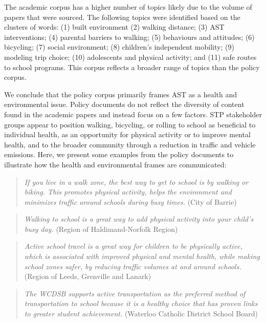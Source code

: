 \documentclass[]{elsarticle} %
\begin{document}
The academic corpus has a higher number of topics likely due to the
volume of papers that were sourced. The following topics were identified
based on the clusters of words: (1) built environment (2) walking
distance; (3) AST interventions; (4) parental barriers to walking; (5)
behaviours and attitudes; (6) bicycling; (7) social environment; (8)
children's independent mobility; (9) modeling trip choice; (10)
adolescents and physical activity; and (11) safe routes to school
programs. This corpus reflects a broader range of topics than the policy
corpus.

We conclude that the policy corpus primarily frames AST as a health and
environmental issue. Policy documents do not reflect the diversity of
content found in the academic papers and instead focus on a few factors.
STP stakeholder groups appear to position walking, bicycling, or rolling
to school as beneficial to individual health, as an opportunity for
physical activity or to improve mental health, and to the broader
community through a reduction in traffic and vehicle emissions. Here, we
present some examples from the policy documents to illustrate how the
health and environmental frames are communicated:

\begin{quote}
\emph{If you live in a walk zone, the best way to get to school is by
walking or biking. This promotes physical activity, helps the
environment and minimizes traffic around schools during busy times.}
(City of Barrie)
\end{quote}

\begin{quote}
\emph{Walking to school is a great way to add physical activity into
your child's busy day.} (Region of Haldimand-Norfolk Region)
\end{quote}

\begin{quote}
\emph{Active school travel is a great way for children to be physically
active, which is associated with improved physical and mental health,
while making school zones safer, by reducing traffic volumes at and
around schools.}(Region of Leeds, Grenville and Lanark)
\end{quote}

\begin{quote}
\emph{The WCDSB supports active transportation as the preferred method
of transportation to school because it is a healthy choice that has
proven links to greater student achievement.} (Waterloo Catholic
District School Board)
\end{quote}
\end{document}
